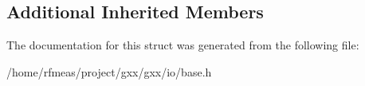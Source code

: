 \subsection*{Additional Inherited Members}


The documentation for this struct was generated from the following file\+:\begin{DoxyCompactItemize}
\item 
/home/rfmeas/project/gxx/gxx/io/base.\+h\end{DoxyCompactItemize}
